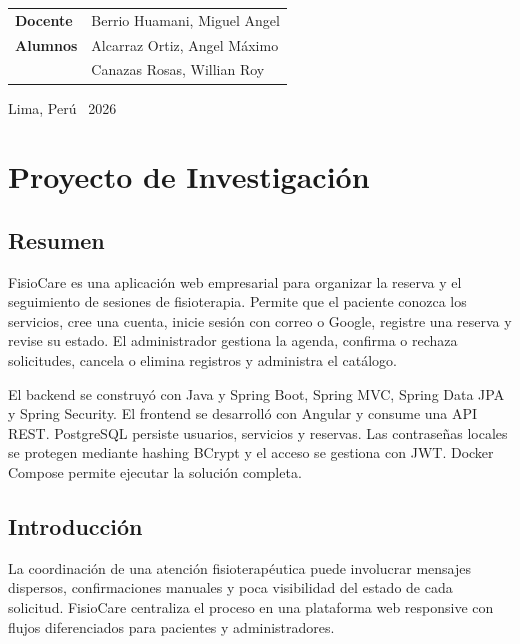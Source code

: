 \documentclass[12pt,a4paper,oneside]{report}
\begin{document}
\begin{titlepage}
\begin{minipage}{0.82\textwidth}
\vfill
\begin{tcolorbox}[width=0.96\textwidth,colback=LightGray,colframe=LineGray,boxrule=0.6pt,arc=3pt,left=12pt,right=12pt,top=10pt,bottom=10pt]
\begin{tabularx}{\textwidth}{@{}p{3.1cm}Y@{}}
\textcolor{CibertecBlue}{\sffamily\bfseries Docente} & Berrio Huamani, Miguel Angel\\[7pt]
\textcolor{CibertecBlue}{\sffamily\bfseries Alumnos} & Alcarraz Ortiz, Angel Máximo\\
& Canazas Rosas, Willian Roy
\end{tabularx}
\end{tcolorbox}
\vfill
{\sffamily\color{TextGray}\small Lima, Perú \textbullet\ 2026\par}
\end{minipage}
\end{titlepage}

\tableofcontents
\clearpage
{}

\chapter{Proyecto de Investigación}

\section{Resumen}
\begin{projectsummary}
FisioCare es una aplicación web empresarial para organizar la reserva y el seguimiento de sesiones de fisioterapia. Permite que el paciente conozca los servicios, cree una cuenta, inicie sesión con correo o Google, registre una reserva y revise su estado. El administrador gestiona la agenda, confirma o rechaza solicitudes, cancela o elimina registros y administra el catálogo.

El backend se construyó con Java y Spring Boot, Spring MVC, Spring Data JPA y Spring Security. El frontend se desarrolló con Angular y consume una API REST. PostgreSQL persiste usuarios, servicios y reservas. Las contraseñas locales se protegen mediante hashing BCrypt y el acceso se gestiona con JWT. Docker Compose permite ejecutar la solución completa.
\end{projectsummary}

\section{Introducción}
La coordinación de una atención fisioterapéutica puede involucrar mensajes dispersos, confirmaciones manuales y poca visibilidad del estado de cada solicitud. FisioCare centraliza el proceso en una plataforma web responsive con flujos diferenciados para pacientes y administradores.
\end{document}
